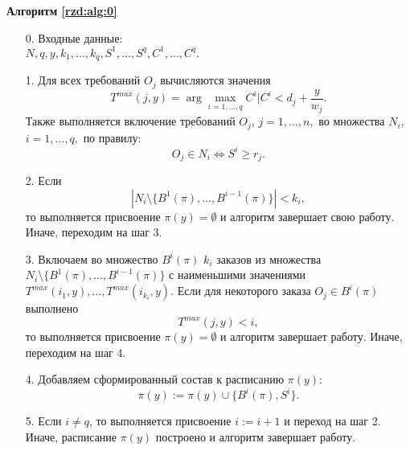 \begin{algorithm}[H]\label{rzd:alg:0}
\NoCaptionOfAlgo
\caption{\textbf{Алгоритм \ref{rzd:alg:0}}}
\begin{itemize}
\item[0.] Входные данные:\\
 $N, q, y, k_1, \dots, k_q, S^1, \dots, S^q, C^1, \dots, C^q.$

\item[1.] Для всех требований $O_j$ вычисляются значения $$T^{max}(j, y) = \arg \max\limits_{i = 1, \dots, q} C^i | C^i < d_j + \frac{y}{w_j}.$$ Также выполняется включение требований $O_j$, $j=1, \dots, n,$ во множества $N_i$, $i=1, \dots, q,$ по правилу:
    $$O_j \in N_i \Leftrightarrow S^i \geq r_j.$$
\item[2.] Если
          $$|N_i \setminus \{B^1(\pi),\dots, B^{i-1}(\pi)\}| < k_i,$$
           то выполняется присвоение $\pi(y) = \emptyset$ и алгоритм завершает свою работу. Иначе, переходим на шаг 3.
\item[3.] Включаем во множество $B^i(\pi)$ $k_i$ заказов из множества $N_i \setminus \{B^1(\pi),\dots, B^{i-1}(\pi)\}$ с наименьшими значениями $T^{max}(i_1,y), \dots, T^{max}(i_{k_i},y)$. Если для некоторого заказа $O_j \in B^i(\pi)$ выполнено
    $$T^{max}(j,y) < i,$$
    то выполняется присвоение $\pi(y) = \emptyset$ и алгоритм завершает работу. Иначе, переходим на шаг 4.
\item[4.] Добавляем сформированный состав к расписанию $\pi(y)$:
$$\pi(y) := \pi(y) \cup \{B^i(\pi), S^i\}.$$
\item[5.] Если $i \neq q$, то выполняется присвоение $i:=i+1$ и переход на шаг 2. Иначе, расписание $\pi(y)$ построено и алгоритм завершает работу.
\end{itemize}
\end{algorithm}

